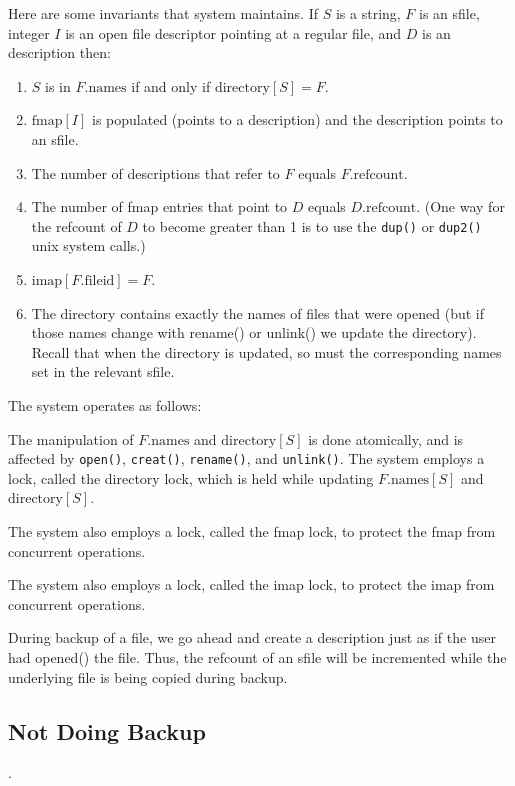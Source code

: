 \documentclass[10pt]{article}
\begin{document}
Here are some invariants that system maintains.   If $S$ is a string, $F$ is an sfile, integer $I$  is an open
file descriptor pointing at a regular file, and $D$ is an description then:
\begin{enumerate}
\item  $S$ is in $F.\mbox{names}$ if and only if $\mbox{directory}[S]=F$.
\item  $\mbox{fmap}[I]$ is populated (points to a description) and the
description points to an sfile.
\item  The number of descriptions that refer to $F$ equals $F.\mbox{refcount}$.
\item  The number of fmap entries that point to $D$ equals $D.\mbox{refcount}$.
(One way for the refcount of $D$ to become greater than 1 is to use the \texttt{dup()} or \texttt{dup2()} unix system calls.)
\item $\mbox{imap}[F.\mbox{fileid}] = F$.
\item The directory contains exactly the names of files that were
  opened (but if those names change with rename() or unlink() we
  update the directory). Recall that when the directory is updated, so
  must the corresponding names set in the relevant sfile.
\end{enumerate}

The system operates as follows:

The manipulation of $F.\mbox{names}$ and $\mbox{directory}[S]$ is done
atomically, and is affected by \texttt{open()}, \texttt{creat()},
\texttt{rename()}, and \texttt{unlink()}.  The system employs a lock,
called the directory lock, which is held while updating
$F.\mbox{names}[S]$ and $\mbox{directory}[S]$.

The system also employs a lock, called the fmap lock, to protect the
fmap from concurrent operations.

The system also employs a lock, called the imap lock, to protect the imap from concurrent operations.

During backup of a file, we go ahead and create a description just as
if the user had opened() the file.  Thus, the refcount of an sfile
will be incremented while the underlying file is being copied during
backup.


\subsection*{Not Doing Backup}

.
\end{document}
